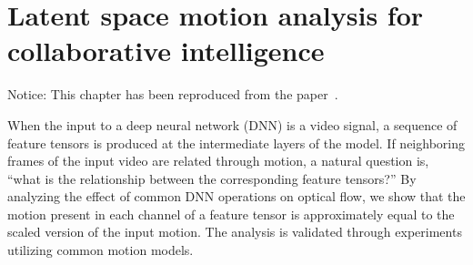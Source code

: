 \chapter{Latent space motion analysis for collaborative intelligence}
\label{ch:video_latent_space_motion_analysis}

%
%
%




%




\begin{center}
  \small
  Notice: This chapter has been reproduced from the paper~\cite{ulhaq2021analysis}.
\end{center}




\begin{chapabstract}
When the input to a deep neural network (DNN) is a video signal, a sequence of feature tensors is produced at the intermediate layers of the model. If neighboring frames of the input video are related through motion, a natural question is, ``what is the relationship between the corresponding feature tensors?'' By analyzing the effect of common DNN operations on optical flow, we show that the motion present in each channel of a feature tensor is approximately equal to the scaled version of the input motion. The analysis is validated through experiments utilizing common motion models. %
\end{chapabstract}


